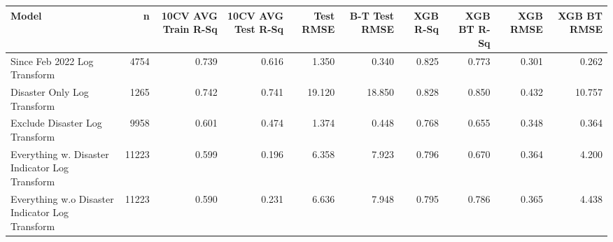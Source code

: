 
\begin{tabular}{l|r|r|r|r|r|r|r|r|r}
\hline
Model & n & 10CV AVG Train R-Sq & 10CV AVG Test R-Sq & Test RMSE & B-T Test RMSE & XGB R-Sq & XGB BT R-Sq & XGB RMSE & XGB BT RMSE\\
\hline
Since Feb 2022 Log Transform & 4754 & 0.739 & 0.616 & 1.350 & 0.340 & 0.825 & 0.773 & 0.301 & 0.262\\
\hline
Disaster Only Log Transform & 1265 & 0.742 & 0.741 & 19.120 & 18.850 & 0.828 & 0.850 & 0.432 & 10.757\\
\hline
Exclude Disaster Log Transform & 9958 & 0.601 & 0.474 & 1.374 & 0.448 & 0.768 & 0.655 & 0.348 & 0.364\\
\hline
Everything w. Disaster Indicator Log Transform & 11223 & 0.599 & 0.196 & 6.358 & 7.923 & 0.796 & 0.670 & 0.364 & 4.200\\
\hline
Everything w.o Disaster Indicator Log Transform & 11223 & 0.590 & 0.231 & 6.636 & 7.948 & 0.795 & 0.786 & 0.365 & 4.438\\
\hline
\end{tabular}
